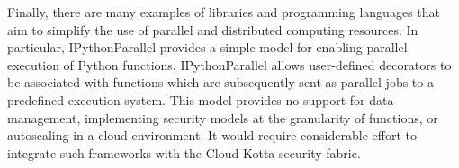 Finally, there are many examples of libraries and programming 
languages that aim to simplify the use of parallel and distributed computing resources. 
In particular, IPythonParallel provides a simple model for 
enabling parallel execution of Python functions. IPythonParallel
allows user-defined decorators to be associated with functions
which are subsequently sent as parallel jobs to a predefined 
execution system. This model provides no support for data management, 
implementing security models at the granularity of functions, or autoscaling in a cloud
environment. It would require considerable effort to integrate such frameworks
with the Cloud Kotta security fabric. 

%
%
%
